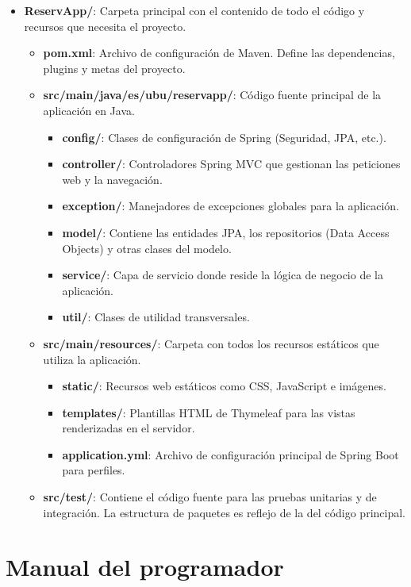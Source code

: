 \begin{itemize}
   \item \textbf{ReservApp/}: Carpeta principal con el contenido de todo el código y recursos que necesita el proyecto.
   \begin{itemize}
      \item \textbf{pom.xml}: Archivo de configuración de Maven. Define las dependencias, plugins y metas del proyecto.
      \item \textbf{src/main/java/es/ubu/reservapp/}: Código fuente principal de la aplicación en Java.
      \begin{itemize}
         \item \textbf{config/}: Clases de configuración de Spring (Seguridad, JPA, etc.).
         \item \textbf{controller/}: Controladores Spring MVC que gestionan las peticiones web y la navegación.
         \item \textbf{exception/}: Manejadores de excepciones globales para la aplicación.
         \item \textbf{model/}: Contiene las entidades JPA, los repositorios (Data Access Objects) y otras clases del modelo.
         \item \textbf{service/}: Capa de servicio donde reside la lógica de negocio de la aplicación.
         \item \textbf{util/}: Clases de utilidad transversales.
      \end{itemize}
      \item \textbf{src/main/resources/}: Carpeta con todos los recursos estáticos que utiliza la aplicación.
      \begin{itemize}
         \item \textbf{static/}: Recursos web estáticos como CSS, JavaScript e imágenes.
         \item \textbf{templates/}: Plantillas HTML de Thymeleaf para las vistas renderizadas en el servidor.
         \item \textbf{application.yml}: Archivo de configuración principal de Spring Boot para perfiles.
      \end{itemize}
      \item \textbf{src/test/}: Contiene el código fuente para las pruebas unitarias y de integración. La estructura de paquetes es reflejo de la del código principal.
   \end{itemize}
\end{itemize}

\section{Manual del programador}

